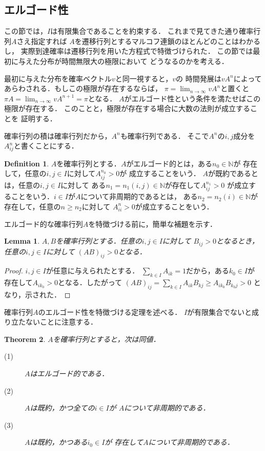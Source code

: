 \documentclass[dvipdfmx,autodetect-engine]{jsarticle}
\newtheorem{theorem}{Theorem}[section]
\newtheorem{lemma}[theorem]{Lemma}
\theoremstyle{remark}
\theoremstyle{definition}
\newtheorem{definition}{Definition}[section]
\newcommand{\N}{\mathbb{N}}
\begin{document}
\subsection{エルゴード性}
この節では，$I$は有限集合であることを約束する．
これまで見てきた通り確率行列$A$さえ指定すれば
$A$を遷移行列とするマルコフ連鎖のほとんどのことはわかるし，
実際到達確率は遷移行列を用いた方程式で特徴づけられた．
この節では最初に与えた分布が時間無限大の極限において
どうなるのかを考える．

最初に与えた分布を確率ベクトル$v$と同一視すると，$v$の
時間発展は$vA^n$によってあらわされる．もしこの極限が存在するならば，
$\pi = \lim_{n \to \infty}vA^n$と置くと
$\pi A = \lim_{n \to \infty} v A^{n+1} = \pi$となる．
$A$がエルゴード性という条件を満たせばこの極限が存在する．
このことと，極限が存在する場合に大数の法則が成立することを
証明する．

確率行列の積は確率行列だから，$A^n$も確率行列である．
そこで$A^n$の$i,j$成分を$A_{ij}^n$と書くことにする．


\begin{definition}\label{ergodic}
    $A$を確率行列とする．$A$がエルゴード的とは，ある$n_0 \in \N$が
    存在して，任意の$i,j \in I$に対して$A_{ij}^{n_0}>0$が
    成立することをいう．
    $A$が既約であるとは，任意の$i,j\in I$に対して
    ある$n_1 = n_1(i,j)  \in \N$が存在して$A_{ij}^{n_1} >0$
    が成立することをいう．$i \in I$が$A$について非周期的であるとは，
    ある$n_2= n_2(i) \in \N$が存在して，任意の$n \geq n_2$に対して
    $A_{ii}^{n} > 0$が成立することをいう．
\end{definition}


エルゴード的な確率行列$A$を特徴づける前に，簡単な補題を示す．


\begin{lemma}\label{lem_prod}
    $A,B$を確率行列とする．任意の$i,j \in I$に対して
    $B_{ij}>0$となるとき，任意の$i,j \in I$に対して
    $(AB)_{ij} >0$となる．
\end{lemma}


\begin{proof}
    $i,j \in I$が任意に与えられたとする．
    $\sum_{k \in I} A_{ik} = 1$だから，ある$k_0 \in I$が
    存在して$A_{i k_0}>0$となる．したがって
    $(AB)_{ij} = \sum_{k \in I} A_{ik} B_{kj} \geq A_{ik_0}B_{k_0 j} > 0$
    となり，示された．
\end{proof}


確率行列$A$のエルゴード性を特徴づける定理を述べる．
$I$が有限集合でないと成り立たないことに注意する．


\begin{theorem}
    $A$を確率行列とすると，次は同値．
    \begin{description}
        \item[(1)] $A$はエルゴード的である．
        \item[(2)] $A$は既約，かつ全ての$i \in I$が
        $A$について非周期的である． 
        \item[(3)] $A$は既約，かつある$i_0 \in I$が
        存在して$A$について非周期的である． 
    \end{description}
\end{theorem}
\end{document}
